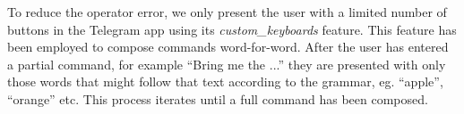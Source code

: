 \label{ssec:keyboard}
\noindent To reduce the operator error, we only present the user with a limited number of buttons in the Telegram app using its \emph{custom\_keyboards} feature. %
This feature has been employed to compose commands word-for-word. After the user has  entered a partial command, for example “Bring me the ...” they are presented with only those words that might follow that text according to the grammar, eg. “apple”, “orange” etc. This process iterates until a full command has been composed.
